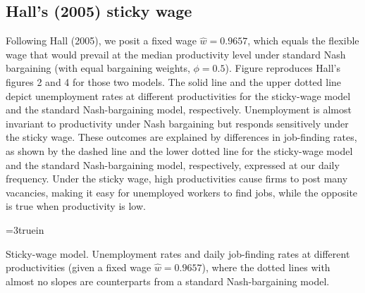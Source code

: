 \subsection{Hall's (2005) sticky wage}\label{sec:FS_Hall_simul}%


Following  Hall (2005),  we posit a
fixed wage $\hat w = 0.9657$, which  equals the flexible wage that
would prevail at the median productivity level under standard Nash
bargaining (with equal bargaining weights, $\phi=0.5$).
Figure  reproduces Hall's figures 2 and 4
for those two models. The solid line and the upper dotted line
depict unemployment rates at different productivities for the
sticky-wage model and the standard Nash-bargaining model,
respectively.
Unemployment is almost invariant to productivity under Nash bargaining
but responds sensitively under the sticky wage. These outcomes are
explained by differences in job-finding rates, as shown by the
dashed line and the lower dotted line for the
sticky-wage model and the standard Nash-bargaining model,
respectively, expressed at our daily frequency.
Under the sticky wage, high productivities cause firms to post many
vacancies, making it easy for unemployed workers to find
jobs, while the opposite is true when productivity is low.

\centerline{\epsfxsize=3truein}
\caption{Sticky-wage model. Unemployment rates and daily job-finding
rates at different productivities (given a fixed wage $\hat w = 0.9657$),
where the dotted lines with almost no slopes are counterparts from
a standard Nash-bargaining model.}
\endfigure


